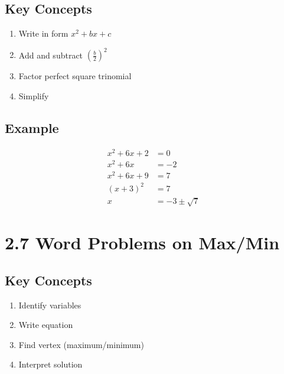 \documentclass[12pt]{article}
\begin{document}
\subsection*{Key Concepts}
\begin{tcolorbox}[colback=lightgray,colframe=primary,title=Steps to Complete the Square]
    \begin{enumerate}
        \item Write in form $x^2 + bx + c$
        \item Add and subtract $(\frac{b}{2})^2$
        \item Factor perfect square trinomial
        \item Simplify
    \end{enumerate}
\end{tcolorbox}

\subsection*{Example}
\begin{tcolorbox}[colback=lightgray,colframe=secondary,title=Example]
    \begin{align*}
        x^2 + 6x + 2 &= 0 \\
        x^2 + 6x &= -2 \\
        x^2 + 6x + 9 &= 7 \\
        (x + 3)^2 &= 7 \\
        x &= -3 \pm \sqrt{7}
    \end{align*}
\end{tcolorbox}

\section{2.7 Word Problems on Max/Min}
\subsection*{Key Concepts}
\begin{tcolorbox}[colback=lightgray,colframe=primary,title=Problem-Solving Steps]
    \begin{enumerate}
        \item Identify variables
        \item Write equation
        \item Find vertex (maximum/minimum)
        \item Interpret solution
    \end{enumerate}
\end{tcolorbox}
\end{document}
